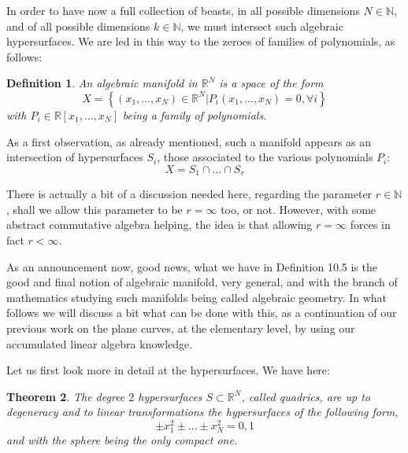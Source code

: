 \documentclass[12pt]{amsbook}
\newtheorem{theorem}{Theorem}[chapter]
\newtheorem{definition}[theorem]{Definition}
\begin{document}
\bigskip

In order to have now a full collection of beasts, in all possible dimensions $N\in\mathbb N$, and of all possible dimensions $k\in\mathbb N$, we must intersect such algebraic hypersurfaces. We are led in this way to the zeroes of families of polynomials, as follows:


\begin{definition}
An algebraic manifold in $\mathbb R^N$ is a space of the form
$$X=\left\{(x_1,\ldots,x_N)\in\mathbb R^N\Big|P_i(x_1,\ldots,x_N)=0,\forall i\right\}$$
with $P_i\in\mathbb R[x_1,\ldots,x_N]$ being a family of polynomials.
\end{definition}

As a first observation, as already mentioned, such a manifold appears as an intersection of hypersurfaces $S_i$, those associated to the various polynomials $P_i$:
$$X=S_1\cap\ldots\cap S_r$$

There is actually a bit of a discussion needed here, regarding the parameter $r\in\mathbb N$, shall we allow this parameter to be $r=\infty$ too, or not. However, with some abstract commutative algebra helping, the idea is that allowing $r=\infty$ forces in fact $r<\infty$.

\bigskip

As an announcement now, good news, what we have in Definition 10.5 is the good and final notion of algebraic manifold, very general, and with the branch of mathematics studying such manifolds being called algebraic geometry. In what follows we will discuss a bit what can be done with this, as a continuation of our previous work on the plane curves, at the elementary level, by using our accumulated linear algebra knowledge.

\bigskip

Let us first look more in detail at the hypersurfaces. We have here:


\begin{theorem}
The degree $2$ hypersurfaces $S\subset\mathbb R^N$, called quadrics, are up to degeneracy and to linear transformations the hypersurfaces of the following form,
$$\pm x_1^2\pm\ldots\pm x_N^2=0,1$$
and with the sphere being the only compact one.
\end{theorem}
\end{document}
